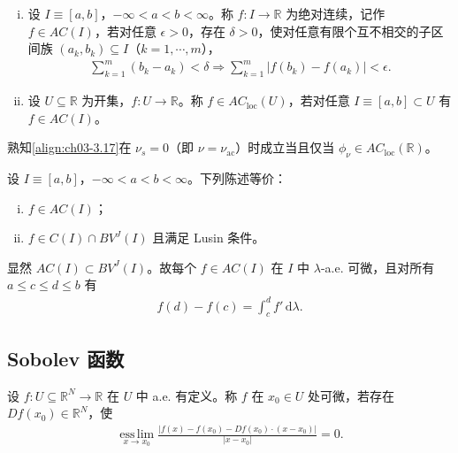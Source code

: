 \documentclass[../../main.tex]{subfiles}%
\begin{document}
\begin{definition}\label{definition:ch03-绝对连续}
\begin{enumerate}[(i)]
\item 设 $I\equiv[a,b]$，$-\infty<a<b<\infty$。称 $f:I\to\mathbb{R}$ 为绝对连续，记作 $f\in AC(I)$，若对任意 $\epsilon>0$，存在 $\delta>0$，使对任意有限个互不相交的子区间族 $(a_k,b_k)\subseteq I$（$k=1,\cdots ,m$），
\begin{align*}
\sum_{k=1}^m(b_k-a_k)<\delta\Rightarrow\sum_{k=1}^m|f(b_k)-f(a_k)|<\epsilon.
\end{align*}
\item 设 $U\subseteq\mathbb{R}$ 为开集，$f:U\to\mathbb{R}$。称 $f\in AC_{\mathrm{loc}}(U)$，若对任意 $I\equiv[a,b]\subset U$ 有 $f\in AC(I)$。
\end{enumerate}
\end{definition}

熟知\eqref{align:ch03-3.17}在 $\nu_s=0$（即 $\nu=\nu_{\mathrm{ac}}$）时成立当且仅当 $\phi_\nu\in AC_{\mathrm{loc}}(\mathbb{R})$。

\begin{theorem}\label{theorem:ch03-VBZ}
设 $I\equiv[a,b]$，$-\infty<a<b<\infty$。下列陈述等价：
\begin{enumerate}[(i)]
\item $f\in AC(I)$；
\item $f\in C(I)\cap BV^J(I)$ 且满足 Lusin 条件。
\end{enumerate}
\end{theorem}

\begin{remark}\label{remark:ch03-AC蕴含}
显然 $AC(I)\subset BV^J(I)$。故每个 $f\in AC(I)$ 在 $I$ 中 $\lambda$-a.e. 可微，且对所有 $a\leqslant c\leqslant d\leqslant b$ 有
\begin{align*}
f(d)-f(c)=\int_c^d f'\,\mathrm{d}\lambda.
\end{align*}
\end{remark}

\subsection{Sobolev 函数}\label{subsection:ch03-Sobolev函数}

\begin{definition}\label{definition:ch03-强可微}
设 $f:U\subseteq\mathbb{R}^N\to\mathbb{R}$ 在 $U$ 中 a.e. 有定义。称 $f$ 在 $x_0\in U$ 处可微，若存在 $Df(x_0)\in\mathbb{R}^N$，使
\begin{align*}
\operatorname*{ess\,lim}_{x\to x_0}\frac{|f(x)-f(x_0)-Df(x_0)\cdot(x-x_0)|}{|x-x_0|}=0.
\end{align*}
\end{definition}
\end{document}
